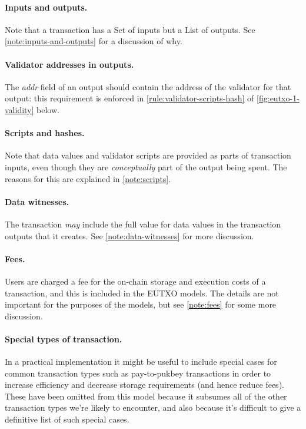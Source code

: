 \documentclass[a4paper]{article}
\newcounter{note}
\begin{document}
\paragraph{Inputs and outputs.} Note that a transaction has a
\textsf{Set} of inputs but a \textsf{List} of outputs. See
\cref{note:inputs-and-outputs} for a discussion of why.

\paragraph{Validator addresses in outputs.} The \textit{addr} field
of an output should contain the address of the validator for
that output: this requirement is enforced in
\cref{rule:validator-scripts-hash} of
\cref{fig:eutxo-1-validity} below.

\paragraph{Scripts and hashes.} Note that data values and validator scripts are
provided as parts of transaction inputs, even though they are
\emph{conceptually} part of the output being spent.
The reasons for this are explained in \cref{note:scripts}.

\paragraph{Data witnesses.} The transaction \emph{may} include the full
value for data values in the transaction outputs that it creates.
See \cref{note:data-witnesses} for more discussion.

\paragraph{Fees.}  Users are charged a fee for the on-chain storage
and execution costs of a transaction, and this is included in the
EUTXO models.  The details are not important for the purposes of the
models, but see \cref{note:fees} for some more discussion.

\paragraph{Special types of transaction.} In a practical
implementation it might be useful to include special cases for common
transaction types such as pay-to-pukbey transactions in order to
increase efficiency and decrease storage requirements (and hence
reduce fees).  These have been omitted from this model because it
subsumes all of the other transaction types we're likely to encounter,
and also because it's difficult to give a definitive list of such
special cases.
\end{document}
